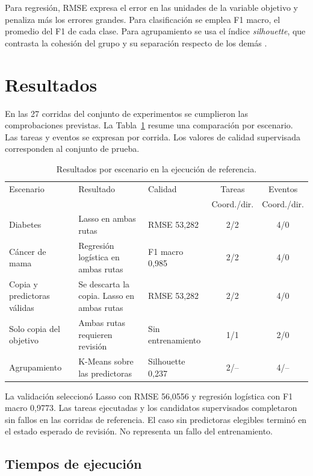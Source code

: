\documentclass[11pt]{article}
\begin{document}
Para regresión, RMSE expresa el error en las unidades de la variable objetivo y penaliza más los errores grandes. Para clasificación se emplea F1 macro, el promedio del F1 de cada clase. Para agrupamiento se usa el índice \textit{silhouette}, que contrasta la cohesión del grupo y su separación respecto de los demás \cite{rousseeuw}.

\section{Resultados}

En las 27 corridas del conjunto de experimentos se cumplieron las comprobaciones previstas. La Tabla~\ref{tab:resultados} resume una comparación por escenario. Las tareas y eventos se expresan por corrida. Los valores de calidad supervisada corresponden al conjunto de prueba.

\begin{table}[htbp]
\centering
\small
\caption{Resultados por escenario en la ejecución de referencia.}
\label{tab:resultados}
\begin{tabularx}{\textwidth}{@{}X X l c c@{}}
\toprule
Escenario & Resultado & Calidad & Tareas & Eventos \\
 & & & Coord./dir. & Coord./dir. \\
\midrule
Diabetes & Lasso en ambas rutas & RMSE 53,282 & 2/2 & 4/0 \\
Cáncer de mama & Regresión logística en ambas rutas & F1 macro 0,985 & 2/2 & 4/0 \\
Copia y predictoras válidas & Se descarta la copia. Lasso en ambas rutas & RMSE 53,282 & 2/2 & 4/0 \\
Solo copia del objetivo & Ambas rutas requieren revisión & Sin entrenamiento & 1/1 & 2/0 \\
Agrupamiento & K-Means sobre las predictoras & Silhouette 0,237 & 2/-- & 4/-- \\
\bottomrule
\end{tabularx}
\end{table}

La validación seleccionó Lasso con RMSE 56,0556 y regresión logística con F1 macro 0,9773. Las tareas ejecutadas y los candidatos supervisados completaron sin fallos en las corridas de referencia. El caso sin predictoras elegibles terminó en el estado esperado de revisión. No representa un fallo del entrenamiento.

\subsection{Tiempos de ejecución}
\end{document}
